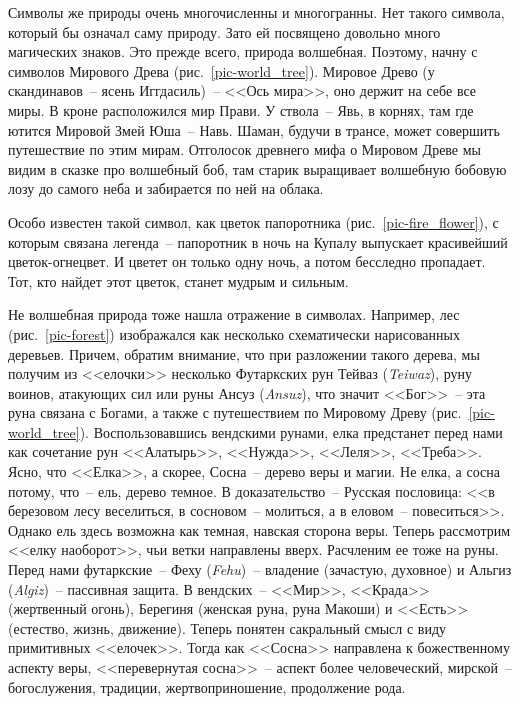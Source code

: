 \documentclass[pscyr,titlepage,chapters]{hedreport}
\begin{document}
  Символы же природы очень многочисленны и многогранны. Нет такого символа,
  который бы означал саму природу. Зато ей посвящено довольно много магических
  знаков. Это прежде всего, природа волшебная. Поэтому, начну с символов
  Мирового Древа (рис.~\ref{pic-world_tree}). Мировое Древо
  (у скандинавов~-- ясень Иггдасиль)~-- <<Ось мира>>, оно держит на себе все
  миры. В кроне расположился мир Прави. У ствола~-- Явь, в корнях, там где
  ютится Мировой Змей Юша~-- Навь. Шаман, будучи в трансе, может совершить
  путешествие по этим мирам. Отголосок древнего
  мифа о Мировом Древе мы видим в сказке про волшебный боб, там старик
  выращивает волшебную бобовую лозу до самого неба и забирается по ней на
  облака.

  Особо известен такой символ, как цветок папоротника
  (рис.~\ref{pic-fire_flower}), с которым связана легенда~-- папоротник в ночь
  на Купалу выпускает красивейший цветок-огнецвет. И цветет он только одну ночь,
  а потом бесследно пропадает. Тот, кто найдет этот цветок, станет мудрым и
  сильным.

  Не волшебная природа тоже нашла отражение в символах. Например, лес
  (рис.~\ref{pic-forest}) изображался как несколько схематически нарисованных
  деревьев. Причем, обратим внимание, что при разложении такого дерева, мы
  получим из <<елочки>> несколько Футаркских рун Тейваз (\emph{Teiwaz}), руну
  воинов, атакующих сил или руны Ансуз (\emph{Ansuz}), что значит <<Бог>>~-- эта
  руна связана с Богами, а также с путешествием по Мировому Древу
  (рис.~\ref{pic-world_tree}). Воспользовавшись вендскими рунами, елка
  предстанет перед нами как сочетание рун <<Алатырь>>, <<Нужда>>, <<Леля>>,
  <<Треба>>. Ясно, что <<Елка>>, а скорее, Сосна~-- дерево веры и магии. Не
  елка, а сосна потому, что~-- ель, дерево темное. В доказательство~-- Русская
  пословица: <<в березовом лесу веселиться, в сосновом~-- молиться, а в
  еловом~-- повеситься>>. Однако ель здесь возможна как темная, навская сторона
  веры. Теперь рассмотрим <<елку наоборот>>, чьи ветки направлены вверх.
  Расчленим ее тоже на руны. Перед нами футаркские~-- Феху (\emph{Fehu})~--
  владение (зачастую, духовное) и Альгиз (\emph{Algiz})~-- пассивная защита. В
  вендских~-- <<Мир>>, <<Крада>> (жертвенный огонь), Берегиня (женская руна,
  руна Макоши) и <<Есть>> (естество, жизнь, движение). Теперь понятен сакральный
  смысл с виду примитивных <<елочек>>. Тогда как <<Сосна>> направлена к
  божественному аспекту веры, <<перевернутая сосна>>~-- аспект более
  человеческий, мирской~-- богослужения, традиции, жертвоприношение, продолжение
  рода.
\end{document}
